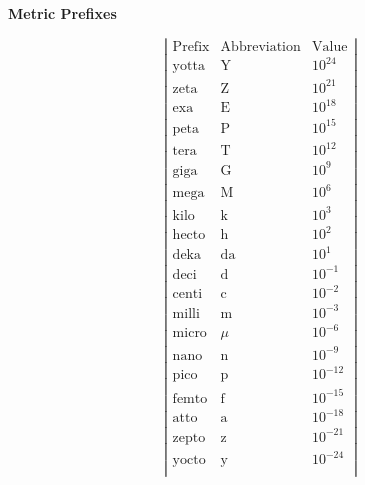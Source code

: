 \documentclass[12pt]{report}
\begin{document}
\begin{center}
{\bf \huge Metric Prefixes}
\end{center}

{\Large
$$\left|\begin{array}{ccc}
\mbox{Prefix} & \mbox{Abbreviation} & \mbox{Value} \\
\mbox{yotta} & \mbox{Y} & 10^{24} \\
\mbox{zeta} & \mbox{Z} & 10^{21} \\
\mbox{exa} & \mbox{E} & 10^{18} \\
\mbox{peta} & \mbox{P} & 10^{15} \\
\mbox{tera} & \mbox{T} & 10^{12} \\
\mbox{giga} & \mbox{G} & 10^{9} \\
\mbox{mega} & \mbox{M} & 10^{6} \\
\mbox{kilo} & \mbox{k} & 10^{3} \\
\mbox{hecto} & \mbox{h} & 10^{2} \\
\mbox{deka} & \mbox{da} & 10^{1} \\
\mbox{deci} & \mbox{d} & 10^{-1} \\
\mbox{centi} & \mbox{c} & 10^{-2} \\
\mbox{milli} & \mbox{m} & 10^{-3} \\
\mbox{micro} & \mu & 10^{-6} \\
\mbox{nano} & \mbox{n} & 10^{-9} \\
\mbox{pico} & \mbox{p} & 10^{-12} \\
\mbox{femto} & \mbox{f} & 10^{-15} \\
\mbox{atto} & \mbox{a} & 10^{-18} \\
\mbox{zepto} & \mbox{z} & 10^{-21} \\
\mbox{yocto} & \mbox{y} & 10^{-24} \\
\end{array}\right|
$$
}
\end{document}
